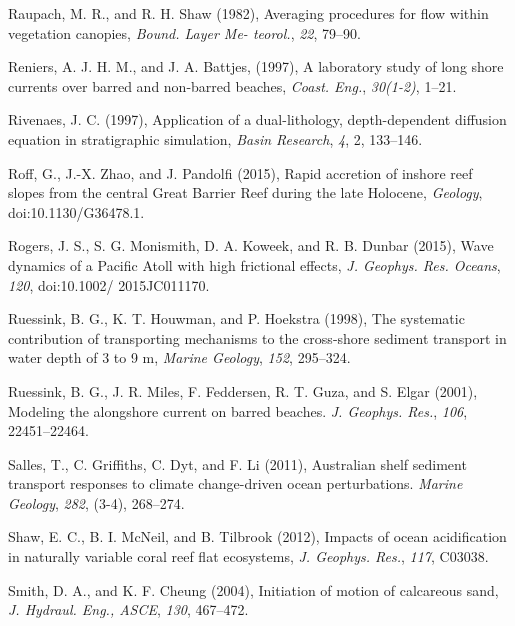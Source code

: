 \documentclass[default,jgrga]{agutex2015}
\begin{document}
\begin{article}
\begin{thebibliography}{}
Raupach, M. R., and R. H. Shaw (1982), Averaging procedures for flow within vegetation canopies, \textit{Bound. Layer Me-
teorol.}, \textit{22}, 79--90.

Reniers, A. J. H. M., and J. A. Battjes, (1997), A laboratory study of long shore currents over barred and non-barred beaches,  \textit{Coast. Eng.}, \textit{30(1-2)}, 1--21.

Rivenaes, J. C. (1997), Application of a dual-lithology, depth-dependent diffusion equation in stratigraphic simulation, \textit{Basin Research}, \textit{4}, 2, 133--146.

Roff, G., J.-X. Zhao, and J. Pandolfi (2015), Rapid accretion of inshore reef slopes from the central Great Barrier Reef during the late Holocene, \textit{Geology}, doi:10.1130/G36478.1.

Rogers, J. S., S. G. Monismith, D. A. Koweek, and R. B. Dunbar (2015), Wave dynamics of a Pacific Atoll with high frictional effects, \textit{J. Geophys. Res. Oceans}, \textit{120}, doi:10.1002/ 2015JC011170.

Ruessink, B. G., K. T. Houwman, and P. Hoekstra (1998), The systematic contribution of transporting mechanisms to the cross-shore sediment transport in water depth of 3 to 9 m, \textit{Marine Geology}, \textit{152}, 295--324.

Ruessink, B. G., J. R. Miles, F. Feddersen, R. T. Guza, and S. Elgar (2001), Modeling the alongshore current on barred beaches.  \textit{J. Geophys. Res.}, \textit{106}, 22451--22464.

Salles, T., C. Griffiths, C. Dyt, and F. Li (2011), Australian shelf sediment transport responses to climate change-driven ocean perturbations. \textit{Marine Geology}, \textit{282}, (3-4), 268--274.

Shaw, E. C., B. I. McNeil, and B. Tilbrook (2012), Impacts of ocean acidification in naturally variable coral reef flat ecosystems, \textit{J. Geophys. Res.}, \textit{117}, C03038.

Smith, D. A., and K. F. Cheung (2004), Initiation of motion of calcareous sand, \textit{J. Hydraul. Eng., ASCE}, \textit{130}, 467--472.


\end{thebibliography}
\end{article}
\end{document}
